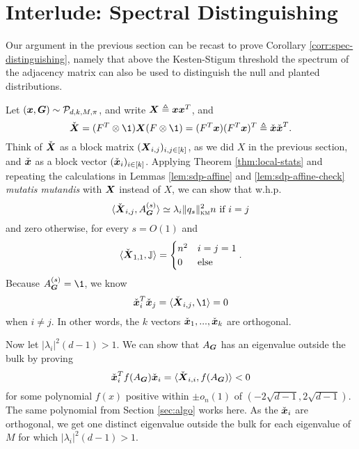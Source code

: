 \section{Interlude: Spectral Distinguishing} %
\label{sec:spectral}

Our argument in the previous section can be recast to prove Corollary \ref{corr:spec-distinguishing}, namely that above the Kesten-Stigum threshold the spectrum of the adjacency matrix can also be used to distinguish the null and planted distributions. 

Let $({\boldsymbol{x}},\boldsymbol{G}) \sim \mathcal{P}_{d,k,M,\pi}$, and write $\boldsymbol{X} \triangleq {\boldsymbol{x}} {\boldsymbol{x}}^T$, and 
$$
 \check \bX = (F^T \otimes \1)\bX (F \otimes \1) = (F^T \bx)(F^T\bx)^T \triangleq \check \bx \check \bx^T.
$$ 
Think of $\check {\boldsymbol{X}}$ as a block matrix $(\boldsymbol{X}_{i,j})_{i,j \in [k]}$, as we did $X$ in the previous section, and $\check {{\boldsymbol{x}}}$ as a block vector $(\check {{\boldsymbol{x}}}_i)_{i\in [k]}$. Applying Theorem \ref{thm:local-stats} and repeating the calculations in Lemmas \ref{lem:sdp-affine} and \ref{lem:sdp-affine-check} \textit{mutatis mutandis} with $\boldsymbol{X}$ instead of $X$, we can show  that w.h.p.
$$
    \langle \check {\boldsymbol{X}}_{i,j}, A^{(s)}_{\boldsymbol{G}} \rangle \simeq \lambda_i \|q_s\|^2_{\textsc{km}} n \text{ if $i=j$}
$$
and zero otherwise, for every $s = O(1)$ and
$$
    \langle \check {\boldsymbol{X}}_{1,1}, \mathbb{J} \rangle = \begin{cases} n^2 & i=j=1 \\ 0 & \text{else} \end{cases}.
$$
Because $\nb{s}{\bG} =\1$, we know 
$$
    \check \bx_i^T \check \bx_j = \langle \check \bX_{i,j}, \1 \rangle = 0
$$
when $i\neq j$. In other words, the $k$ vectors $\check {{\boldsymbol{x}}}_1,...,\check {{\boldsymbol{x}}}_k$ are orthogonal.

Now let $|\lambda_i|^2(d-1) > 1$. We can show that $A_{\boldsymbol{G}}$ has an eigenvalue outside the bulk by proving 
$$
\check{{\boldsymbol{x}}}_i^T f(A_{\boldsymbol{G}})\check{{\boldsymbol{x}}}_i = \langle \check {\boldsymbol{X}}_{i,i}, f(A_{\boldsymbol{G}}) \rangle < 0
$$ 
for some polynomial $f(x)$ positive within $\pm o_n(1)$ of $(-2\sqrt{d-1},2\sqrt{d-1})$. The same polynomial from Section \ref{sec:algo} works here. As the $\check {{\boldsymbol{x}}}_i$ are orthogonal, we get one distinct eigenvalue outside the bulk for each eigenvalue of $M$ for which $|\lambda_i|^2(d-1) > 1$.

